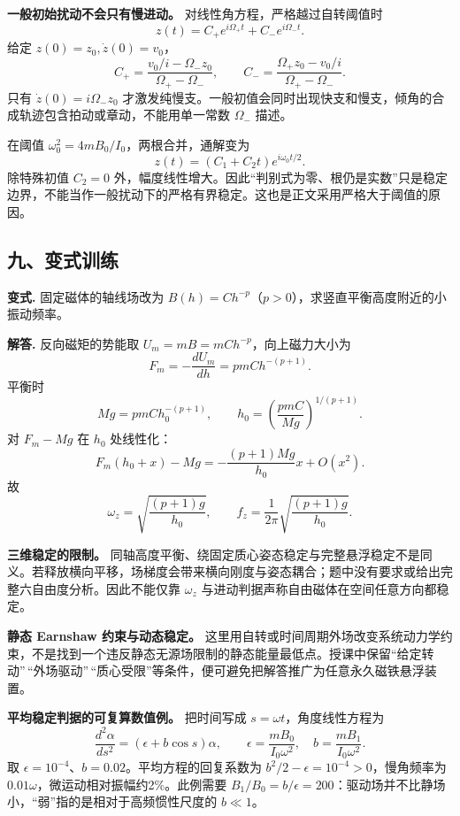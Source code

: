\documentclass[12pt,a4paper,UTF8]{ctexart}
\begin{document}
\textbf{一般初始扰动不会只有慢进动。} 对线性角方程，严格越过自转阈值时
\[
z(t)=C_+e^{i\Omega_+t}+C_-e^{i\Omega_-t}.
\] 给定 \(z(0)=z_0,\dot z(0)=v_0\)， \[
C_+=\frac{v_0/i-\Omega_-z_0}{\Omega_+-\Omega_-},
\qquad
C_-=\frac{\Omega_+z_0-v_0/i}{\Omega_+-\Omega_-}.
\] 只有 \(\dot z(0)=i\Omega_-z_0\)
才激发纯慢支。一般初值会同时出现快支和慢支，倾角的合成轨迹包含拍动或章动，不能用单一常数
\(\Omega_-\) 描述。

在阈值 \(\omega_0^2=4mB_0/I_0\)，两根合并，通解变为 \[
z(t)=(C_1+C_2t)e^{i\omega_0t/2}.
\] 除特殊初值 \(C_2=0\)
外，幅度线性增大。因此``判别式为零、根仍是实数''只是稳定边界，不能当作一般扰动下的严格有界稳定。这也是正文采用严格大于阈值的原因。

\subsection{九、变式训练}\label{ux4e5dux53d8ux5f0fux8badux7ec3-2}

\textbf{变式.} 固定磁体的轴线场改为
\(B(h)=Ch^{-p}\)（\(p>0\)），求竖直平衡高度附近的小振动频率。

\textbf{解答.} 反向磁矩的势能取 \(U_m=mB=mCh^{-p}\)，向上磁力大小为 \[
F_m=-\frac{dU_m}{dh}=pmC h^{-(p+1)}.
\] 平衡时 \[
Mg=pmC h_0^{-(p+1)},
\qquad
\boxed{h_0=\left(\frac{pmC}{Mg}\right)^{1/(p+1)}}.
\] 对 \(F_m-Mg\) 在 \(h_0\) 处线性化： \[
F_m(h_0+x)-Mg
=-\frac{(p+1)Mg}{h_0}x+O(x^2).
\] 故 \[
\boxed{\omega_z=\sqrt{\frac{(p+1)g}{h_0}}},
\qquad
\boxed{f_z=\frac1{2\pi}\sqrt{\frac{(p+1)g}{h_0}}}.
\]

\textbf{三维稳定的限制。}
同轴高度平衡、绕固定质心姿态稳定与完整悬浮稳定不是同义。若释放横向平移，场梯度会带来横向刚度与姿态耦合；题中没有要求或给出完整六自由度分析。因此不能仅靠
\(\omega_z\) 与进动判据声称自由磁体在空间任意方向都稳定。

\textbf{静态 Earnshaw 约束与动态稳定。}
这里用自转或时间周期外场改变系统动力学约束，不是找到一个违反静态无源场限制的静态能量最低点。授课中保留``给定转动''\,``外场驱动''\,``质心受限''等条件，便可避免把解答推广为任意永久磁铁悬浮装置。

\textbf{平均稳定判据的可复算数值例。} 把时间写成
\(s=\omega t\)，角度线性方程为 \[
\frac{d^2\alpha}{ds^2}=(\epsilon+b\cos s)\alpha,
\qquad \epsilon=\frac{mB_0}{I_0\omega^2},\quad
b=\frac{mB_1}{I_0\omega^2}.
\] 取 \(\epsilon=10^{-4}\)、\(b=0.02\)。平均方程的回复系数为
\(b^2/2-\epsilon=10^{-4}>0\)，慢角频率为
\(0.01\omega\)，微运动相对振幅约2\%。此例需要
\(B_1/B_0=b/\epsilon=200\)：驱动场并不比静场小，``弱''指的是相对于高频惯性尺度的
\(b\ll1\)。
\end{document}
